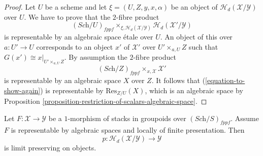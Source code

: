 \begin{proof}
Let $U$ be a scheme and let $\xi = (U, Z, y, x, \alpha)$ be an object of
$\mathcal{H}_d(\mathcal{X}/\mathcal{Y})$ over $U$.
We have to prove that the $2$-fibre product
\begin{equation}
\label{equation-to-show-again}
(\textit{Sch}/U)_{fppf}
\times_{\xi, \mathcal{H}_d(\mathcal{X}/\mathcal{Y})}
\mathcal{H}_d(\mathcal{X}'/\mathcal{Y})
\end{equation}
is representable by an algebraic space \'etale over $U$.
An object of this over $a : U' \to U$ corresponds to an object
$x'$ of $\mathcal{X}'$ over $U' \times_{a, U} Z$ such that
$G(x') \cong x|_{U' \times_{a, U} Z}$. By assumption the $2$-fibre product
$$
(\textit{Sch}/Z)_{fppf} \times_{x, \mathcal{X}} \mathcal{X}'
$$
is representable by an algebraic space $X$ over $Z$. It follows that
(\ref{equation-to-show-again}) is representable by $\text{Res}_{Z/U}(X)$,
which is an algebraic space by
Proposition \ref{proposition-restriction-of-scalars-algebraic-space}.
\end{proof}

\begin{lemma}
\label{lemma-limit-preserving}
Let $F : \mathcal{X} \to \mathcal{Y}$ be a $1$-morphism of stacks in groupoids
over $(\textit{Sch}/S)_{fppf}$. Assume $F$ is representable by algebraic
spaces and locally of finite presentation. Then
$$
p : \mathcal{H}_d(\mathcal{X}/\mathcal{Y}) \to \mathcal{Y}
$$
is limit preserving on objects. 
\end{lemma}

